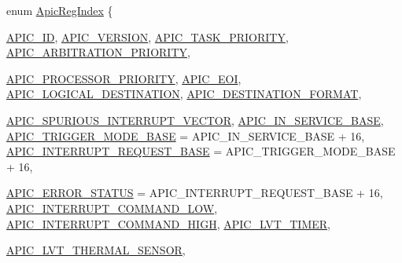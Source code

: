 \begin{DoxyCompactItemize}
\item 
enum \hyperlink{namespaceX86ISA_aaa839fcdf6f426c03c7382fcc29ac649}{ApicRegIndex} \{ \par
\hyperlink{namespaceX86ISA_aaa839fcdf6f426c03c7382fcc29ac649acd891a613799d8d7d83e1be86cbf496d}{APIC\_\-ID}, 
\hyperlink{namespaceX86ISA_aaa839fcdf6f426c03c7382fcc29ac649a60b0a6b6dab97b269e1fc9cccd33d7c6}{APIC\_\-VERSION}, 
\hyperlink{namespaceX86ISA_aaa839fcdf6f426c03c7382fcc29ac649afd5e32c09545fe1754c5d78fbe029b85}{APIC\_\-TASK\_\-PRIORITY}, 
\hyperlink{namespaceX86ISA_aaa839fcdf6f426c03c7382fcc29ac649a1503828ef17c9b88de44b778f6efd52c}{APIC\_\-ARBITRATION\_\-PRIORITY}, 
\par
\hyperlink{namespaceX86ISA_aaa839fcdf6f426c03c7382fcc29ac649a15292e2ed7b167af9a19a4db2406077b}{APIC\_\-PROCESSOR\_\-PRIORITY}, 
\hyperlink{namespaceX86ISA_aaa839fcdf6f426c03c7382fcc29ac649abdb2804479ba12b1366696688da795e7}{APIC\_\-EOI}, 
\hyperlink{namespaceX86ISA_aaa839fcdf6f426c03c7382fcc29ac649a137774031793b99cde054b3dccb12bdd}{APIC\_\-LOGICAL\_\-DESTINATION}, 
\hyperlink{namespaceX86ISA_aaa839fcdf6f426c03c7382fcc29ac649a77cc386e5345ab6ec3c09dd960973dd6}{APIC\_\-DESTINATION\_\-FORMAT}, 
\par
\hyperlink{namespaceX86ISA_aaa839fcdf6f426c03c7382fcc29ac649ad2fbb7c848d92024ea8c72740bc5a5b0}{APIC\_\-SPURIOUS\_\-INTERRUPT\_\-VECTOR}, 
\hyperlink{namespaceX86ISA_aaa839fcdf6f426c03c7382fcc29ac649ab44e07d8e0d33a340f8d69334f0a3382}{APIC\_\-IN\_\-SERVICE\_\-BASE}, 
\hyperlink{namespaceX86ISA_aaa839fcdf6f426c03c7382fcc29ac649a579e62281d1a2f66fe39809a385f90ae}{APIC\_\-TRIGGER\_\-MODE\_\-BASE} =  APIC\_\-IN\_\-SERVICE\_\-BASE + 16, 
\hyperlink{namespaceX86ISA_aaa839fcdf6f426c03c7382fcc29ac649a2ee7104372cb641092daabc28ffdd0c1}{APIC\_\-INTERRUPT\_\-REQUEST\_\-BASE} =  APIC\_\-TRIGGER\_\-MODE\_\-BASE + 16, 
\par
\hyperlink{namespaceX86ISA_aaa839fcdf6f426c03c7382fcc29ac649a56d3d52b81eeb1310a517a97474a110d}{APIC\_\-ERROR\_\-STATUS} =  APIC\_\-INTERRUPT\_\-REQUEST\_\-BASE + 16, 
\hyperlink{namespaceX86ISA_aaa839fcdf6f426c03c7382fcc29ac649a4fa27532542040e5d73d4e69e0d0a07d}{APIC\_\-INTERRUPT\_\-COMMAND\_\-LOW}, 
\hyperlink{namespaceX86ISA_aaa839fcdf6f426c03c7382fcc29ac649aa54f4f509b32a83bddec4a363c00cb11}{APIC\_\-INTERRUPT\_\-COMMAND\_\-HIGH}, 
\hyperlink{namespaceX86ISA_aaa839fcdf6f426c03c7382fcc29ac649ad1228146fe200dc1da0a4e48613e64de}{APIC\_\-LVT\_\-TIMER}, 
\par
\hyperlink{namespaceX86ISA_aaa839fcdf6f426c03c7382fcc29ac649ae6a8e929de3184f5e54eb2300b60c6a9}{APIC\_\-LVT\_\-THERMAL\_\-SENSOR}, 

\end{DoxyCompactItemize}
